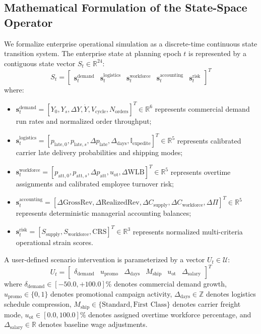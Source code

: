 \documentclass[journal]{IEEEtran}
\begin{document}
\subsection{Mathematical Formulation of the State-Space Operator}
We formalize enterprise operational simulation as a discrete-time continuous state transition system. The enterprise state at planning epoch $t$ is represented by a contiguous state vector $S_t \in \mathbb{R}^{24}$:
\begin{equation}
S_t = \begin{bmatrix}
\bm{s}_t^{\text{demand}} & \bm{s}_t^{\text{logistics}} & \bm{s}_t^{\text{workforce}} & \bm{s}_t^{\text{accounting}} & \bm{s}_t^{\text{risk}}
\end{bmatrix}^T
\end{equation}
where:
\begin{itemize}
    \item $\bm{s}_t^{\text{demand}} = [Y_0, Y_s, \Delta Y, \dot{Y}, V_{\text{cycle}}, N_{\text{orders}}]^T \in \mathbb{R}^6$ represents commercial demand run rates and normalized order throughput;
    \item $\bm{s}_t^{\text{logistics}} = [p_{\text{late}, 0}, p_{\text{late}, s}, \Delta p_{\text{late}}, \Delta_{\text{days}}, \mathbb{I}_{\text{expedite}}]^T \in \mathbb{R}^5$ represents calibrated carrier late delivery probabilities and shipping modes;
    \item $\bm{s}_t^{\text{workforce}} = [p_{\text{att}, 0}, p_{\text{att}, s}, \Delta p_{\text{att}}, u_{\text{ot}}, \Delta \text{WLB}]^T \in \mathbb{R}^5$ represents overtime assignments and calibrated employee turnover risk;
    \item $\bm{s}_t^{\text{accounting}} = [\Delta \text{GrossRev}, \Delta \text{RealizedRev}, \Delta C_{\text{supply}}, \Delta C_{\text{workforce}}, \Delta \Pi]^T \in \mathbb{R}^5$ represents deterministic managerial accounting balances;
    \item $\bm{s}_t^{\text{risk}} = [S_{\text{supply}}, S_{\text{workforce}}, \text{CRS}]^T \in \mathbb{R}^3$ represents normalized multi-criteria operational strain scores.
\end{itemize}

A user-defined scenario intervention is parameterized by a vector $U_t \in \mathcal{U}$:
\begin{equation}
U_t = \begin{bmatrix}
\delta_{\text{demand}} & u_{\text{promo}} & \Delta_{\text{days}} & M_{\text{ship}} & u_{\text{ot}} & \Delta_{\text{salary}}
\end{bmatrix}^T
\end{equation}
where $\delta_{\text{demand}} \in [-50.0, +100.0]\%$ denotes commercial demand growth, $u_{\text{promo}} \in \{0, 1\}$ denotes promotional campaign activity, $\Delta_{\text{days}} \in \mathbb{Z}$ denotes logistics schedule compression, $M_{\text{ship}} \in \{\text{Standard}, \text{First Class}\}$ denotes carrier freight mode, $u_{\text{ot}} \in [0.0, 100.0]\%$ denotes assigned overtime workforce percentage, and $\Delta_{\text{salary}} \in \mathbb{R}$ denotes baseline wage adjustments.
\end{document}
